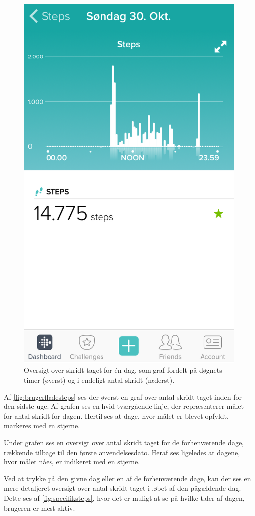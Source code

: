 \begin{figure}[H]
\begin{minipage}{0.48\textwidth}
		\includegraphics[width=0.8\linewidth]{figures/specifiksteps}
		\caption{Oversigt over skridt taget for én dag, som graf fordelt på døgnets timer (øverst) og i endeligt antal skridt (nederst).}
		 \label{fig:specifiksteps}
	\end{minipage}
\end{figure}

\noindent
Af \autoref{fig:brugerfladesteps} ses der øverst en graf over antal skridt taget inden for den sidste uge. Af grafen ses en hvid tværgående linje, der repræsenterer målet for antal skridt for dagen. Hertil ses at dage, hvor målet er blevet opfyldt, markeres med en stjerne.

Under grafen ses en oversigt over antal skridt taget for de forhenværende dage, rækkende tilbage til den første anvendelsesdato. Heraf ses ligeledes at dagene, hvor målet nåes, er indikeret med en stjerne. 

Ved at trykke på den givne dag eller en af de forhenværende dage, kan der ses en mere detaljeret oversigt over antal skridt taget i løbet af den pågældende dag. Dette ses af \autoref{fig:specifiksteps}, hvor det er muligt at se på hvilke tider af dagen, brugeren er mest aktiv.  

